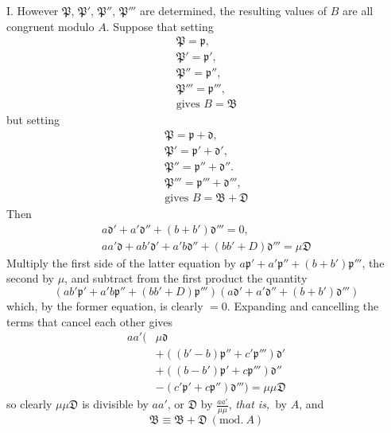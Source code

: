 I. However $\mathfrak{P}$, $\mathfrak{P}'$, $\mathfrak{P}''$, $\mathfrak{P}'''$ are determined, the resulting values of $B$ are all congruent modulo $A$. Suppose that setting
\[
\begin{gathered}\mathfrak{P}=\mathfrak{p},\\ \mathfrak{P}'=\mathfrak{p}',\\ \mathfrak{P}''=\mathfrak{p}'',\\ \mathfrak{P}'''=\mathfrak{p}''',\\\text{gives } B=\mathfrak{B}\end{gathered}
\]
but setting
\[
\begin{gathered}\mathfrak{P}=\mathfrak{p}+\mathfrak{d},\\ \mathfrak{P}'=\mathfrak{p}'+\mathfrak{d}',\\ \mathfrak{P}''=\mathfrak{p}''+\mathfrak{d}''.\\ \mathfrak{P}'''=\mathfrak{p}'''+\mathfrak{d}''',\\\text{gives } B=\mathfrak{B}+\mathfrak{D}\end{gathered}
\]
Then
\[
\begin{gathered}a\mathfrak{d}'+a'\mathfrak{d}''+(b+b')\mathfrak{d}'''=0,\\
aa'\mathfrak{d}+ab'\mathfrak{d}'+a'b\mathfrak{d}''+(bb'+D)\mathfrak{d}'''=\mu\mathfrak{D}\end{gathered}
\]
Multiply the first side of the latter equation by $a\mathfrak{p}'+a'\mathfrak{p}''+(b+b')\mathfrak{p}'''$, the second by $\mu$, and subtract from the first product the quantity
\[
(ab'\mathfrak{p}'+a'b\mathfrak{p}''+(bb'+D)\mathfrak{p}''')(a\mathfrak{d}'+a'\mathfrak{d}''+(b+b')\mathfrak{d}''')
\]
which, by the former equation, is clearly $=0$. Expanding and cancelling the terms that cancel each other gives
\[
\begin{aligned}aa'(&\mu\mathfrak{d}\\&+((b'-b)\mathfrak{p}''+c'\mathfrak{p}''')\mathfrak{d}'\\&+((b-b')\mathfrak{p}'+c\mathfrak{p}''')\mathfrak{d}''\\&-(c'\mathfrak{p}'+c\mathfrak{p}'')\mathfrak{d}''')=\mu\mu\mathfrak{D}\end{aligned}
\]
so clearly $\mu\mu\mathfrak{D}$ is divisible by $aa'$, or $\mathfrak{D}$ by $\frac{aa'}{\mu\mu}$, \textit{that is,}\ by $A$, and
\[
\mathfrak{B}\equiv\mathfrak{B}+\mathfrak{D}\ (\mathrm{mod.}\ A)
\]

